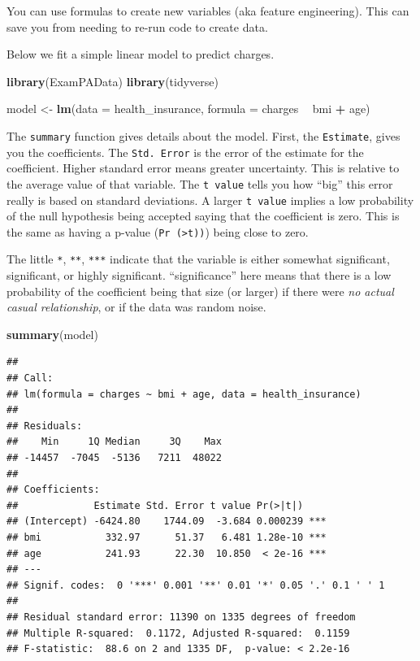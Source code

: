 \documentclass[openany]{book}
\newenvironment{Shaded}{\begin{snugshade}}{\end{snugshade}}
\newcommand{\DataTypeTok}[1]{\textcolor[rgb]{0.13,0.29,0.53}{#1}}
\newcommand{\KeywordTok}[1]{\textcolor[rgb]{0.13,0.29,0.53}{\textbf{#1}}}
\newcommand{\NormalTok}[1]{#1}
\newcommand{\OperatorTok}[1]{\textcolor[rgb]{0.81,0.36,0.00}{\textbf{#1}}}
\newcommand{\StringTok}[1]{\textcolor[rgb]{0.31,0.60,0.02}{#1}}
\begin{document}
You can use formulas to create new variables (aka feature engineering). This can save you from needing to re-run code to create data.

Below we fit a simple linear model to predict charges.

\begin{Shaded}
\begin{Highlighting}[]
\KeywordTok{library}\NormalTok{(ExamPAData)}
\KeywordTok{library}\NormalTok{(tidyverse)}

\NormalTok{model <-}\StringTok{ }\KeywordTok{lm}\NormalTok{(}\DataTypeTok{data =}\NormalTok{ health_insurance, }\DataTypeTok{formula =}\NormalTok{ charges }\OperatorTok{~}\StringTok{ }\NormalTok{bmi }\OperatorTok{+}\StringTok{ }\NormalTok{age)}
\end{Highlighting}
\end{Shaded}

The \texttt{summary} function gives details about the model. First, the \texttt{Estimate}, gives you the coefficients. The \texttt{Std.\ Error} is the error of the estimate for the coefficient. Higher standard error means greater uncertainty. This is relative to the average value of that variable. The \texttt{t\ value} tells you how ``big'' this error really is based on standard deviations. A larger \texttt{t\ value} implies a low probability of the null hypothesis being accepted saying that the coefficient is zero. This is the same as having a p-value (\texttt{Pr\ (\textgreater{}\textbar{}t\textbar{}))}) being close to zero.

The little \texttt{*}, \texttt{**}, \texttt{***} indicate that the variable is either somewhat significant, significant, or highly significant. ``significance'' here means that there is a low probability of the coefficient being that size (or larger) if there were \emph{no actual casual relationship}, or if the data was random noise.

\begin{Shaded}
\begin{Highlighting}[]
\KeywordTok{summary}\NormalTok{(model)}
\end{Highlighting}
\end{Shaded}

\begin{verbatim}
## 
## Call:
## lm(formula = charges ~ bmi + age, data = health_insurance)
## 
## Residuals:
##    Min     1Q Median     3Q    Max 
## -14457  -7045  -5136   7211  48022 
## 
## Coefficients:
##             Estimate Std. Error t value Pr(>|t|)    
## (Intercept) -6424.80    1744.09  -3.684 0.000239 ***
## bmi           332.97      51.37   6.481 1.28e-10 ***
## age           241.93      22.30  10.850  < 2e-16 ***
## ---
## Signif. codes:  0 '***' 0.001 '**' 0.01 '*' 0.05 '.' 0.1 ' ' 1
## 
## Residual standard error: 11390 on 1335 degrees of freedom
## Multiple R-squared:  0.1172, Adjusted R-squared:  0.1159 
## F-statistic:  88.6 on 2 and 1335 DF,  p-value: < 2.2e-16
\end{verbatim}
\end{document}
